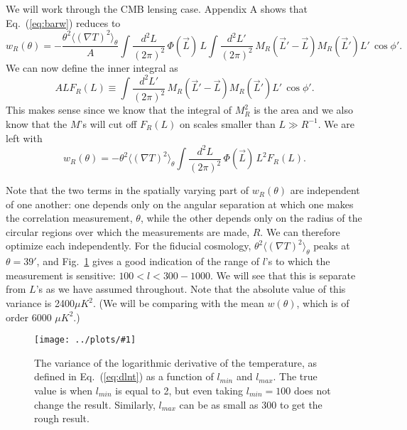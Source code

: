 \documentclass[prd,amsmath,amssymb,floatfix,superscriptaddress,nofootinbib]{revtex4-1}
\def\be{\begin{equation}}
\def\ee{\end{equation}}
\newcommand{\ec}[1]{Eq.~(\ref{eq:#1})}
\newcommand{\rf}[1]{\ref{fig:#1}}
\newcommand{\sfigg}[2]{
\texttt{[image: ../plots/\#1]}
        }
\newcommand{\Spng}[2]{
   \begin{figure}[thbp]
   \begin{center}
    \sfigg{../plots/#1.png}{.7\columnwidth}
    \caption{{\small #2}}
    \label{fig:#1}
     \end{center}
   \end{figure}
}
\begin{document}
We will work through the CMB lensing case. Appendix A shows that \ec{barw} reduces to
\be
w_R(\theta) =  - \frac{\theta^2\langle (\nabla T)^2\rangle_\theta}{A} \int \frac{d^2L}{(2\pi)^2}\, \Phi(\vec L)\, L 
\int \frac{d^2L'}{(2\pi)^2}\, M_R(\vec L'-\vec L)  M_R(\vec L')L'\,\cos\phi'.\ee
We can now define the inner integral as
\be
ALF_R(L) \equiv \int \frac{d^2L'}{(2\pi)^2}\, M_R(\vec L'-\vec L)  M_R(\vec L')L'\,\cos\phi'.\ee
This makes sense since we know that the integral of $M_R^2$ is the area and we also know that the $M$'s will cut off $F_R(L)$ on scales smaller than $L\gg R^{-1}$. We are left with
\be
w_R(\theta) =  - {\theta^2\langle (\nabla T)^2\rangle_\theta} \int \frac{d^2L}{(2\pi)^2}\, \Phi(\vec L)\, L^2 F_R(L) 
.\ee


Note that the two terms in the spatially varying part of $w_R(\theta)$ are independent of one another: one depends only on the angular separation at which one makes the correlation measurement, $\theta$, while the other depends only on the radius of the circular regions over which the measurements are made, $R$. We can therefore optimize each independently. For the fiducial cosmology, $\theta^2\langle (\nabla T)^2\rangle_\theta$ peaks at $\theta=39'$, and Fig.~\rf{dlntheta} gives a good indication of the range of $l$'s to which the measurement is sensitive: $100<l<300-1000$. We will see that this is separate from $L$'s as we have assumed throughout. Note that the absolute value of this variance is 2400$\mu K^2$. (We will be comparing with the mean $w(\theta)$, which is of order 6000 $\mu K^2$.) 
\Spng{dlntheta}{The variance of the logarithmic derivative of the temperature, as defined in \ec{dlnt} as a function of $l_{min}$ and $l_{max}$. The true value is when $l_{min}$ is equal to 2, but even taking $l_{min}=100$ does not change the result. Similarly, $l_{max}$ can be as small as 300 to get the rough result.}
\end{document}
